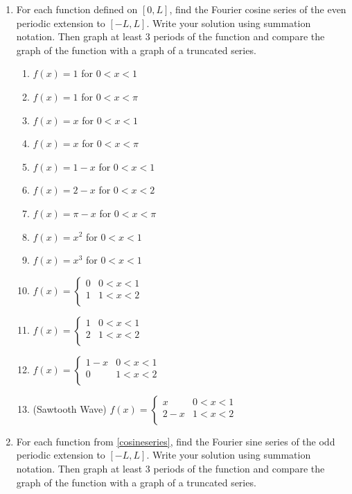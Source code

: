 \begin{enumerate}
	\item \label{cosineseries} For each function defined on $[0,L]$, find the Fourier cosine series of the even periodic extension to $[-L,L]$. Write your solution using summation notation. Then graph at least 3 periods of the function and compare the graph of the function with a graph of a truncated series.
	\begin{multicols}{2}
\begin{enumerate}
	\item $f(x) = 1$ for $0<x<1$
	\item $f(x) = 1$ for $0<x<\pi$
	\item $f(x) = x$ for $0<x<1$
	\item $f(x) = x$ for $0<x<\pi$
	\item $f(x) = 1-x$ for $0<x<1$
	\item $f(x) = 2-x$ for $0<x<2$
	\item $f(x) = \pi-x$ for $0<x<\pi$
	\item $f(x) = x^2$ for $0<x<1$
	\item $f(x) = x^3$ for $0<x<1$
	\item $f(x) = 
	\begin{cases}
	0 & 0<x<1\\
	1 & 1<x<2\\
	\end{cases}$
	\item $f(x) = 
	\begin{cases}
	1 & 0<x<1\\
	2 & 1<x<2\\
	\end{cases}$
	\item $f(x) = 
	\begin{cases}
	1-x & 0<x<1\\
	0 & 1<x<2\\
	\end{cases}$
	\item (Sawtooth Wave) $f(x) = 
	\begin{cases}
	x & 0<x<1\\
	2-x & 1<x<2\\
	\end{cases}$
	
\end{enumerate}
	\end{multicols}
	
	
	\item For each function from \ref{cosineseries}, find the Fourier sine series of the odd periodic extension to $[-L,L]$. Write your solution using summation notation. Then graph at least 3 periods of the function and compare the graph of the function with a graph of a truncated series.
	

\end{enumerate}
